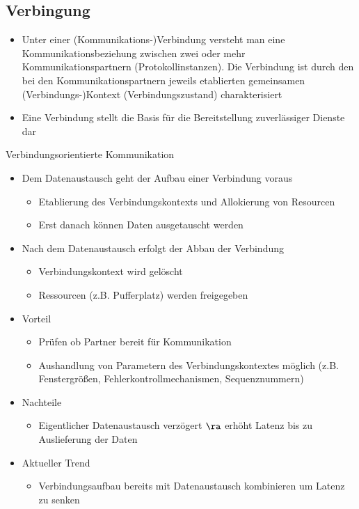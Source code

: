   \subsection{Verbingung}
    \begin{itemize}
      \item Unter einer (Kommunikations-)Verbindung versteht man eine Kommunikationsbeziehung zwischen
        zwei oder mehr Kommunikationspartnern (Protokollinstanzen). Die Verbindung ist durch den bei
        den Kommunikationspartnern jeweils etablierten gemeinsamen (Verbindungs-)Kontext
        (Verbindungszustand) charakterisiert
      \item Eine Verbindung stellt die Basis für die Bereitstellung zuverlässiger Dienste dar
    \end{itemize}
    Verbindungsorientierte Kommunikation
    \begin{itemize}
      \item Dem Datenaustausch geht der Aufbau einer Verbindung voraus
        \begin{itemize}
          \item Etablierung des Verbindungskontexts und Allokierung von Resourcen
          \item Erst danach können Daten ausgetauscht werden
        \end{itemize}
      \item Nach dem Datenaustausch erfolgt der Abbau der Verbindung
        \begin{itemize}
          \item Verbindungskontext wird gelöscht
          \item Ressourcen (z.B. Pufferplatz) werden freigegeben
        \end{itemize}
      \item Vorteil
        \begin{itemize}
          \item Prüfen ob Partner bereit für Kommunikation
          \item Aushandlung von Parametern des Verbindungskontextes möglich (z.B. Fenstergrößen,
            Fehlerkontrollmechanismen, Sequenznummern)
        \end{itemize}
      \item Nachteile
        \begin{itemize}
          \item Eigentlicher Datenaustausch verzögert $\ra$ erhöht Latenz bis zu Auslieferung der Daten
        \end{itemize}
      \item Aktueller Trend
        \begin{itemize}
          \item Verbindungsaufbau bereits mit Datenaustausch kombinieren um Latenz zu senken
        \end{itemize}
    \end{itemize}
